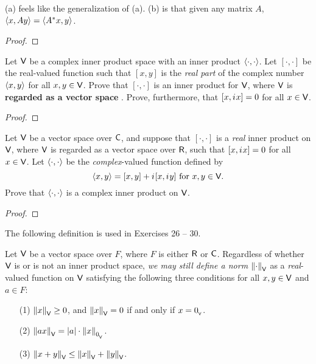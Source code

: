 \begin{note}
(a) feels like the generalization of (a).
(b) is that given any matrix \(A\), \(\left< x, Ay \right> = \left< A^* x, y \right>\).
\end{note}

\begin{proof}
\end{proof}

\begin{exercise} \label{exercise 6.1.24}
Let \(\textsf{V}\) be a complex inner product space with an inner product \(\left< \cdot, \cdot \right>\).
Let \([ \cdot, \cdot ]\) be the real-valued function such that \([x, y]\) is the \emph{real part} of the complex number \(\left< x, y \right>\) for all \(x, y \in \textsf{V}\).
Prove that \([ \cdot, \cdot ]\) is an inner product for \(\textsf{V}\), where \(\textsf{V}\) is \textbf{regarded as a vector space }.
Prove, furthermore, that \([x, {i\mkern1mu} x] = 0\) for all \(x \in \textsf{V}\).
\end{exercise}

\begin{proof}
\end{proof}

\begin{exercise} \label{exercise 6.1.25}
Let \(\textsf{V}\) be a vector space over \(\textsf{C}\), and suppose that \([ \cdot, \cdot ]\) is a \emph{real} inner product on \(\textsf{V}\), where \(\textsf{V}\) is regarded as a vector space over \(\textsf{R}\), such that \([x, {i\mkern1mu} x] = 0\) for all \(x \in \textsf{V}\).
Let \(\left< \cdot, \cdot \right>\) be the \emph{complex}-valued function defined by
\[
    \left< x, y \right> = [x, y] + {i\mkern1mu}[x, {i\mkern1mu} y] \text{ for } x, y \in \textsf{V}.
\]
Prove that \(\left< \cdot, \cdot \right>\) is a complex inner product on \(\textsf{V}\).
\end{exercise}

\begin{proof}
\end{proof}

The following definition is used in Exercises 26 -- 30.

\begin{additional definition} \label{adef 6.2}
Let \(\textsf{V}\) be a vector space over \(F\), where \(F\) is either \(\textsf{R}\) or \(\textsf{C}\).
Regardless of whether \(\textsf{V}\) is or is not an inner product space, \emph{we may still define a norm} \(\left\lVert \cdot \right\rVert_{\textsf{V}}\) as a \emph{real}-valued function on \(\textsf{V}\) satisfying the following three conditions for all \(x, y \in \textsf{V}\) and \(a \in F\):
\begin{enumerate}
\item[(1)] \(\left\lVert x\right\rVert_{\textsf{V}} \ge 0\), and \(\left\lVert x\right\rVert_{\textsf{V}} = 0\) if and only if \(x = 0_{_{\textsf{V}}}\).
\item[(2)] \(\left\lVert ax\right\rVert_{\textsf{V}} = \lvert a\rvert \cdot \left\lVert x\right\rVert_{0_{_{\textsf{V}}}}\).
\item[(3)] \(\left\lVert x + y\right\rVert_{\textsf{V}} \le \left\lVert x\right\rVert_{\textsf{V}} + \left\lVert y\right\rVert_{\textsf{V}}\).
\end{enumerate}
\end{additional definition}

